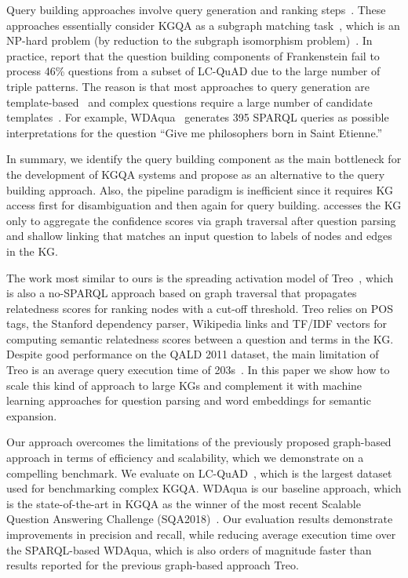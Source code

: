 Query building approaches involve query generation and ranking steps~\cite{maheshwari2018learning,DBLP:conf/esws/ZafarNL18}.
These approaches essentially consider KGQA as a subgraph matching task~\cite{DBLP:conf/coling/BaoDYZZ16,maheshwari2018learning,DBLP:conf/coling/SorokinG18}, which is an NP-hard problem (by reduction to the subgraph isomorphism problem)~\cite{DBLP:conf/sigmod/ZouHWYHZ14}.
In practice, \citet{DBLP:journals/corr/abs-1809-10044} report that the question building components of Frankenstein fail to process 46\% questions from a subset of LC-QuAD due to the large number of triple patterns.
The reason is that most approaches to query generation are template-based~\cite{DBLP:journals/corr/abs-1803-00832} and complex questions require a large number of candidate templates~\cite{DBLP:journals/corr/abs-1809-10044}.
For example, WDAqua~\cite{DBLP:journals/corr/abs-1803-00832} generates 395  SPARQL queries as possible interpretations for the question ``Give me philosophers born in Saint Etienne.''

In summary, we identify the query building component as the main bottleneck for the development of KGQA systems and propose \OurApproach{} as an alternative to the query building approach.
Also, the pipeline paradigm is inefficient since it requires KG access first for disambiguation and then again for query building.
\OurApproach{} accesses the KG only to aggregate the confidence scores via graph traversal after question parsing and shallow linking that matches an input question to labels of nodes and edges in the KG.

The work most similar to ours is the spreading activation model of Treo~\cite{DBLP:journals/dke/FreitasOOSC13}, which is also a no-SPARQL approach based on graph traversal that propagates relatedness scores for ranking nodes with a cut-off threshold.
Treo relies on POS tags, the Stanford dependency parser, Wikipedia links and TF/IDF vectors for computing semantic relatedness scores between a question and terms in the KG.
Despite good performance on the QALD 2011 dataset, the main limitation of Treo is an average query execution time of 203s~\cite{DBLP:journals/dke/FreitasOOSC13}.
In this paper we show how to scale this kind of approach to large KGs and complement it with machine learning approaches for question parsing and word embeddings for semantic expansion.

Our approach overcomes the limitations of the previously proposed graph-based approach in terms of efficiency and scalability, which we demonstrate on a compelling benchmark.
We evaluate \OurApproach{} on LC-QuAD~\cite{DBLP:conf/semweb/TrivediMDL17}, which is the largest dataset used for benchmarking complex KGQA.
WDAqua is our baseline approach, which is the state-of-the-art in KGQA as the winner of the most recent Scalable Question Answering Challenge (SQA2018)~\cite{DBLP:conf/esws/NapolitanoUN18}.
Our evaluation results demonstrate improvements in precision and recall, while reducing average execution time over the SPARQL-based WDAqua, which is also orders of magnitude faster than results reported for the previous graph-based approach Treo.

